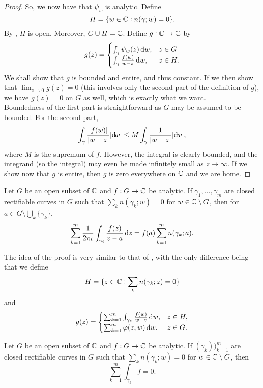 \begin{proof}
		So, we now have that $\psi_w$ is analytic. Define
		\[ H = \{ w \in \mathbb{C} : n(\gamma;w) = 0 \}. \]
		By , $H$ is open. Moreover, $G \cup H = \mathbb{C}$. Define $g:\mathbb{C}\to\mathbb{C}$ by
		\[
			g(z) =
			\begin{cases}
				\int_\gamma \psi_w(z) \dif w, & z \in G \\
				\int_\gamma \frac{f(w)}{w-z} \dif w, & z \in H.
			\end{cases}
		\]
		We shall show that $g$ is bounded and entire, and thus constant. If we then show that $\lim_{z\to 0} g(z) = 0$ (this involves only the second part of the definition of $g$), we have $g(z) = 0$ on $G$ as well, which is exactly what we want.\\
		Boundedness of the first part is straightforward as $G$ may be assumed to be bounded. For the second part,
		\[ \int_\gamma \frac{|f(w)|}{|w-z|} |{\dif}{w}| \le M \int_\gamma \frac{1}{|w-z|} |{\dif}{w}|, \]
		where $M$ is the supremum of $f$. However, the integral is clearly bounded, and the integrand (so the integral) may even be made infinitely small as $z \to \infty$. If we show now that $g$ is entire, then $g$ is zero everywhere on $\mathbb{C}$ and we are home.
	\end{proof}

	\begin{ftheo}
		\label{cauchys integral formula v2}
		Let $G$ be an open subset of $\mathbb{C}$ and $f : G \to \mathbb{C}$ be analytic. If $\gamma_1,\ldots,\gamma_m$ are closed rectifiable curves in $G$ such that $\sum_k n(\gamma_k;w) = 0$ for $w \in \mathbb{C}\setminus G$, then for $a \in G\setminus\bigcup_k\{\gamma_k\}$,
		\[ \sum_{k=1}^m \frac{1}{2\pi\iota} \int_{\gamma_i} \frac{f(z)}{z-a} \dif z = f(a) \sum_{k=1}^m n(\gamma_k;a). \]
	\end{ftheo}
	The idea of the proof is very similar to that of , with the only difference being that we define
	\[ H = \{ z \in \mathbb{C} : \sum_k n(\gamma_k;z) = 0 \} \]
	and
	\[
		g(z) = 
		\begin{cases}
			\sum_{k=1}^m \int_{\gamma_k} \frac{f(w)}{w-z} \dif w, & z \in H, \\
			\sum_{k=1}^m \varphi(z,w) \dif w, & z \in G.
		\end{cases}
	\]

	\begin{fcor}
		\label{cauchys theorem v1}
		Let $G$ be an open subset of $\mathbb{C}$ and $f : G \to \mathbb{C}$ be analytic. If $(\gamma_k))_{k=1}^m$ are closed rectifiable curves in $G$ such that $\sum_k n(\gamma_k;w) = 0$ for $w \in \mathbb{C} \setminus G$, then
		\[ \sum_{k=1}^m \int_{\gamma_k} f = 0. \]
	\end{fcor}

